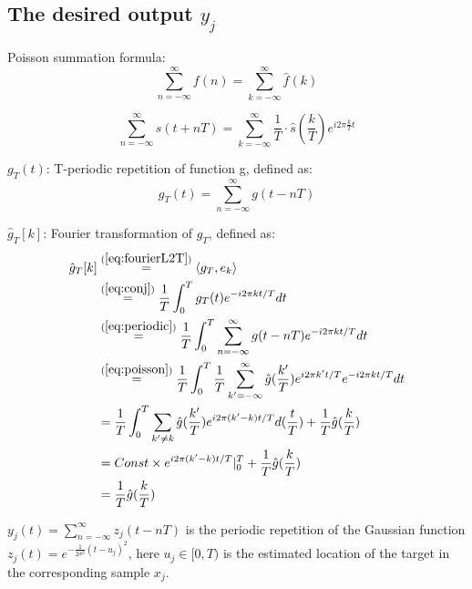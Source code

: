 \documentclass[12pt]{article}
\numberwithin{equation}{section}
\begin{document}
\subsection{The desired output $y_j$}
Poisson summation formula:
\begin{equation}
	\sum_{n=-\infty}^\infty f(n)=\sum_{k=-\infty}^\infty \hat f\left(k\right)
\end{equation} \par
\begin{equation} \label{eq:poisson}
	\sum_{n=-\infty}^{\infty} s(t + nT)=\sum_{k=-\infty}^{\infty} \frac{1}{T}\cdot \hat s\left(\frac{k}{T}\right)e^{i 2\pi \frac{k}{T} t }
\end{equation} \par
$g_T(t)$: T-periodic repetition of function g, defined as:
\begin{equation} \label{eq:periodic}
	g_T(t) = \sum^{\infty}_{n=-\infty} g(t-nT)
\end{equation} \par
$\hat{g}_T[k]$: Fourier transformation of $g_T$, defined as:
\begin{align}\begin{split}\label{eq:fouriergT}
	\hat{g}_T[k] 
	&\stackrel{(\ref{eq:fourierL2T})}{=}  \langle g_T , e_k \rangle \\
	&\stackrel{(\ref{eq:conj})}{=} \frac{1}{T} \int^{T}_{0} g_T(t) e^{-i 2 \pi k t / T} dt \\ 
	&\stackrel{(\ref{eq:periodic})}{=} \frac{1}{T} \int^{T}_{0} \sum^{\infty}_{n=-\infty} g(t-nT) e^{-i 2 \pi k t / T} dt \\
	&\stackrel{(\ref{eq:poisson})}{=} \frac{1}{T} \int^{T}_{0} \frac{1}{T} \sum^{\infty}_{k'=-\infty} \hat{g}(\frac{k'}{T}) e^{i 2 \pi k' t / T}  e^{-i 2 \pi k t / T} dt \\
	&\stackrel{}{=} \frac{1}{T}  \int^{T}_{0} \sum_{k' \neq k} \hat{g}(\frac{k'}{T}) e^{i 2 \pi (k'-k) t / T} d(\frac{t}{T}) +  \frac{1}{T} \hat{g}(\frac{k}{T})\\
	&= Const \times e^{i 2 \pi (k'-k) t / T} |^T_0+  \frac{1}{T} \hat{g}(\frac{k}{T})\\
	&= \frac{1}{T} \hat{g}(\frac{k}{T})
\end{split}\end{align} \par
$y_j(t)=\sum^{\infty}_{n=-\infty}z_j(t-nT)$ is the periodic repetition of the Gaussian function $z_j(t)=e^{-\frac{1}{2\sigma^2}(t-u_j)^2}$, here $u_j \in [0, T)$ is the estimated location of the target in the corresponding sample $x_j$. \par
\end{document}
